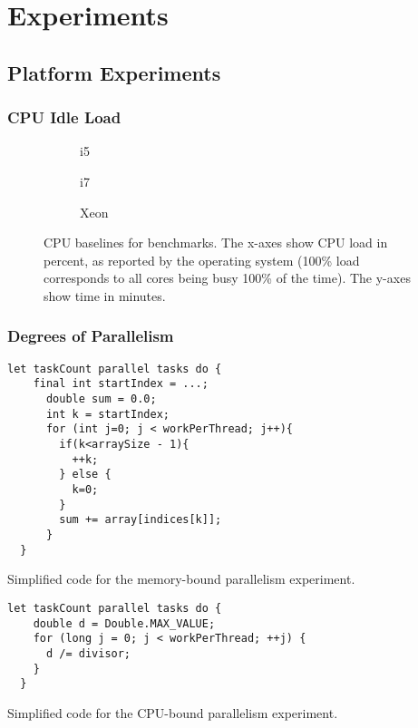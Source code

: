 \chapter{Experiments}
\label{sec:experiments}

\section{Platform Experiments}

\subsection{CPU Idle Load}
\begin{figure}[hbpt]
	\graphicspath{{plots/}}
	\begin{subfigure}{1\textwidth}
		
		\caption{i5}
	\end{subfigure}
	\begin{subfigure}{1\textwidth}
		
		\caption{i7}
	\end{subfigure}
	\begin{subfigure}{1\textwidth}
		
		\caption{Xeon}
	\end{subfigure}
	\caption{CPU baselines for benchmarks. The x-axes show CPU load in
	percent, as reported by the operating system (100\% load corresponds to
	all cores being busy 100\% of the time). The y-axes show time in minutes.}
	\label{fig:cpuload}
\end{figure}

\subsection{Degrees of Parallelism}

\begin{code}
\begin{Verbatim}[frame=single]
  let taskCount parallel tasks do {
    final int startIndex = ...;
      double sum = 0.0;
      int k = startIndex;
      for (int j=0; j < workPerThread; j++){
        if(k<arraySize - 1){
          ++k;
        } else {
          k=0;
        }
        sum += array[indices[k]];
      }
  }
\end{Verbatim}
	\caption{Simplified code for the memory-bound parallelism experiment.}
\end{code}

\begin{code}
\begin{Verbatim}[frame=single]
  let taskCount parallel tasks do {
    double d = Double.MAX_VALUE;
    for (long j = 0; j < workPerThread; ++j) {
      d /= divisor;
    }
  }
\end{Verbatim}
	\caption{Simplified code for the CPU-bound parallelism experiment.}
\end{code}

